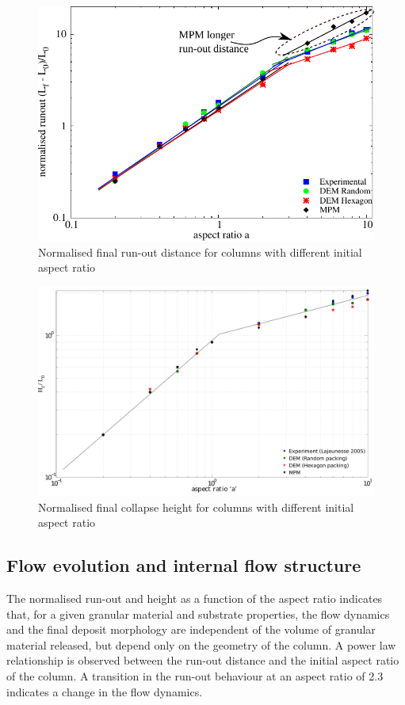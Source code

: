 \begin{figure}[tbhp]
\centering
\includegraphics[width=\textwidth]{runout}
\caption{Normalised final run-out distance for columns with different initial 
aspect ratio}
\label{fig:run-out}
\end{figure}

\begin{figure}[tbhp]
\centering
\includegraphics[width=\textwidth]{height}
\caption{Normalised final collapse height for columns with different initial 
aspect ratio}
\label{fig:height}
\end{figure}

\subsection{Flow evolution and internal flow structure}

The normalised run-out and height as a function of the aspect ratio indicates 
that, for a given granular material and substrate properties, the flow dynamics 
and the final deposit morphology are independent of the volume of granular 
material released, but depend only on the geometry of the column. A 
power law relationship is observed between the run-out distance and the initial 
aspect ratio of the column. A transition in the run-out behaviour at an aspect 
ratio of 2.3 indicates a change in the flow dynamics. 

